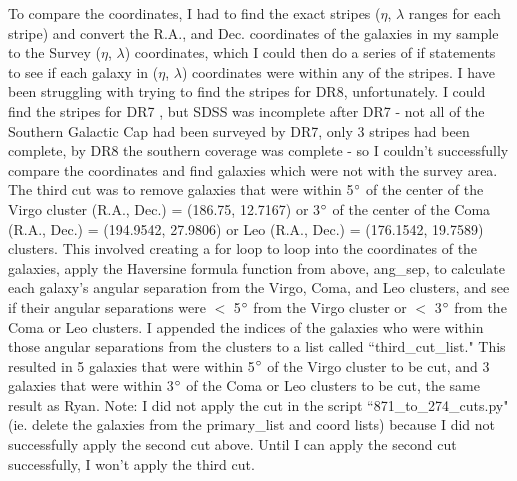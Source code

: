 \documentclass[10pt,letterpaper]{article}
\begin{document}
To compare the coordinates, I had to find the exact stripes ($\eta$, $\lambda$ ranges for each stripe) and convert the R.A., and Dec. coordinates of the galaxies in my sample to the Survey ($\eta$, $\lambda$) coordinates, which I could then do a series of if statements to see if each galaxy in ($\eta$, $\lambda$) coordinates were within any of the stripes. I have been struggling with trying to find the stripes for DR8, unfortunately. I could find the stripes for DR7 \cite{DR7 sky coverage}, but SDSS was incomplete after DR7 - not all of the Southern Galactic Cap had been surveyed by DR7, only 3 stripes had been complete, by DR8 the southern coverage was complete - so I couldn't successfully compare the coordinates and find galaxies which were not with the survey area. \\

The third cut was to remove galaxies that were within 5$\degree$ of the center of the Virgo cluster (R.A., Dec.) = (186.75, 12.7167) or 3$\degree$ of the center of the Coma (R.A., Dec.) = (194.9542, 27.9806) or Leo (R.A., Dec.) = (176.1542, 19.7589) clusters. This involved creating a for loop to loop into the coordinates of the galaxies, apply the Haversine formula function from above, ang\_sep, to calculate each galaxy's angular separation from the Virgo, Coma, and Leo clusters, and see if their angular separations were $<$ 5$\degree$ from the Virgo cluster or $<$ 3$\degree$ from the Coma or Leo clusters. I appended the indices of the galaxies who were within those angular separations from the clusters to a list called ``third\_cut\_list." This resulted in 5 galaxies that were within 5$\degree$ of the Virgo cluster to be cut, and 3 galaxies that were within 3$\degree$ of the Coma or Leo clusters to be cut, the same result as Ryan. Note: I did not apply the cut in the script ``871\_to\_274\_cuts.py" (ie. delete the galaxies from the primary\_list and coord lists) because I did not successfully apply the second cut above. Until I can apply the second cut successfully, I won't apply the third cut.
\end{document}

